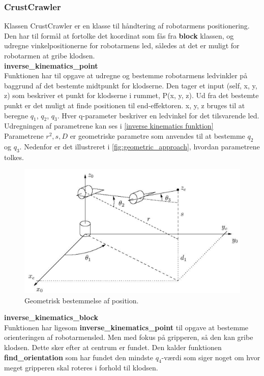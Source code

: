 \subsubsection{CrustCrawler}
\label{subsub: CrustCrawler}

Klassen CrustCrawler er en klasse til håndtering af robotarmens positionering. Den har til formål at fortolke det koordinat som fås fra \textbf{block} klassen, og udregne vinkelpositionerne for robotarmens led, således at det er muligt for robotarmen at gribe klodsen.\\

\textbf{inverse\_kinematics\_point}\\
Funktionen har til opgave at udregne og bestemme robotarmens ledvinkler på baggrund af det bestemte midtpunkt for klodserne. Den tager et input (self, x, y, z) som beskriver et punkt for klodserne i rummet, P(x, y, z). Ud fra det bestemte punkt er det muligt at finde positionen til end-effektoren. x, y, z bruges til at beregne $q_1$, $q_2$, $q_3$. Hver q-parameter beskriver en ledvinkel for det tilsvarende led. Udregningen af parametrene kan ses i \autoref{inverse kinematics funktion}\\

Parametrene $r^2, s, D$ er geometriske parametre som anvendes til at bestemme $q_2$ og $q_3$. Nedenfor er det illustreret i \autoref{fig:geometric_approach}, hvordan parametrene tolkes.\\

\begin{figure}[h]
\centering
\includegraphics[scale=0.4]{images/geometric_approach}
\caption{Geometrisk bestemmelse af position.}
\label{fig:geometric_approach}
\end{figure}

\newpage
\textbf{inverse\_kinematics\_block}\\
Funktionen har ligesom \textbf{inverse\_kinematics\_point} til opgave at bestemme orienteringen af robotarmensled. Men med fokus på gripperen, så den kan gribe klodsen. Dette sker efter at centrum er fundet. Den kalder funktionen \textbf{find\_orientation} som har fundet den mindste $q_4$-værdi som siger noget om hvor meget gripperen skal roteres i forhold til klodsen.

